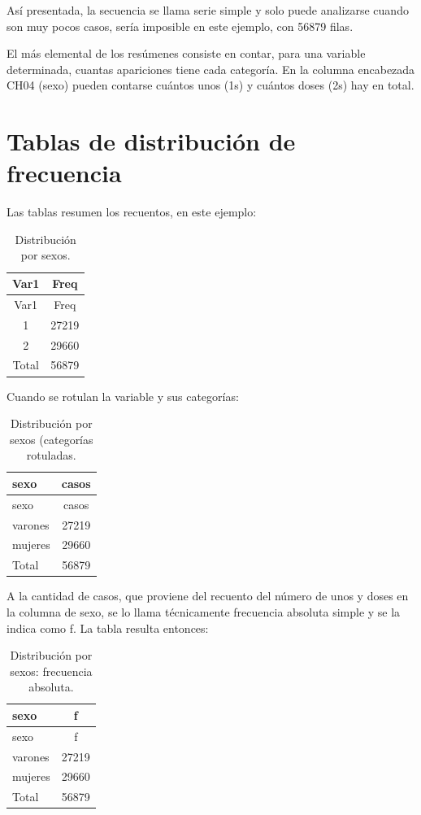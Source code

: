 \documentclass[]{book}
\begin{document}
Así presentada, la secuencia se llama serie simple y solo puede analizarse cuando son muy pocos casos, sería imposible en este ejemplo, con 56879 filas.

El más elemental de los resúmenes consiste en contar, para una variable determinada, cuantas apariciones tiene cada categoría. En la columna encabezada CH04 (sexo) pueden contarse cuántos unos (1s) y cuántos doses (2s) hay en total.

\hypertarget{tablas-de-distribuciuxf3n-de-frecuencia}{%
\section{Tablas de distribución de frecuencia}\label{tablas-de-distribuciuxf3n-de-frecuencia}}

Las tablas resumen los recuentos, en este ejemplo:

\begin{longtable}[]{@{}cc@{}}
\caption{\label{tab:unnamed-chunk-19}Distribución por sexos.}\tabularnewline
\toprule
Var1 & Freq\tabularnewline
\midrule
\endfirsthead
\toprule
Var1 & Freq\tabularnewline
\midrule
\endhead
1 & 27219\tabularnewline
2 & 29660\tabularnewline
Total & 56879\tabularnewline
\bottomrule
\end{longtable}

Cuando se rotulan la variable y sus categorías:

\begin{longtable}[]{@{}lc@{}}
\caption{\label{tab:unnamed-chunk-20}Distribución por sexos (categorías rotuladas.}\tabularnewline
\toprule
sexo & casos\tabularnewline
\midrule
\endfirsthead
\toprule
sexo & casos\tabularnewline
\midrule
\endhead
varones & 27219\tabularnewline
mujeres & 29660\tabularnewline
Total & 56879\tabularnewline
\bottomrule
\end{longtable}

A la cantidad de casos, que proviene del recuento del número de unos y doses en la columna de sexo, se lo llama técnicamente frecuencia absoluta simple y se la indica como f. La tabla resulta entonces:

\begin{longtable}[]{@{}lc@{}}
\caption{\label{tab:unnamed-chunk-21}Distribución por sexos: frecuencia absoluta.}\tabularnewline
\toprule
sexo & f\tabularnewline
\midrule
\endfirsthead
\toprule
sexo & f\tabularnewline
\midrule
\endhead
varones & 27219\tabularnewline
mujeres & 29660\tabularnewline
Total & 56879\tabularnewline
\bottomrule
\end{longtable}
\end{document}
